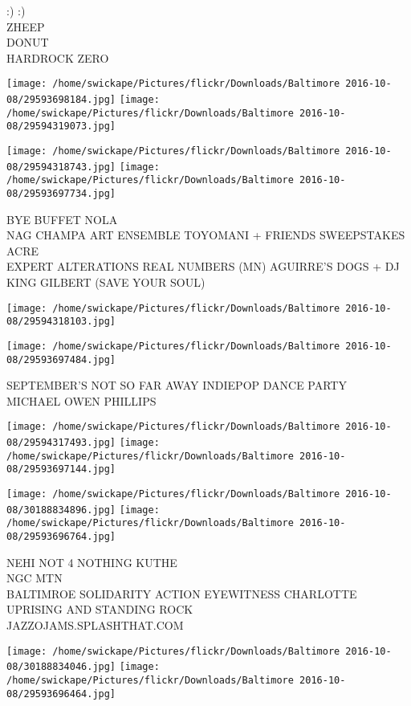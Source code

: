 \documentclass[10pt,letterpaper]{article}
\begin{document}
:) :)\\
ZHEEP\\
DONUT\\
HARDROCK ZERO
\pagebreak

\texttt{[image: /home/swickape/Pictures/flickr/Downloads/Baltimore 2016-10-08/29593698184.jpg]}
\texttt{[image: /home/swickape/Pictures/flickr/Downloads/Baltimore 2016-10-08/29594319073.jpg]}

\texttt{[image: /home/swickape/Pictures/flickr/Downloads/Baltimore 2016-10-08/29594318743.jpg]}
\texttt{[image: /home/swickape/Pictures/flickr/Downloads/Baltimore 2016-10-08/29593697734.jpg]}

BYE BUFFET NOLA\\
NAG CHAMPA ART ENSEMBLE TOYOMANI + FRIENDS SWEEPSTAKES\\
ACRE\\
EXPERT ALTERATIONS REAL NUMBERS (MN) AGUIRRE'S DOGS + DJ KING GILBERT (SAVE YOUR SOUL)
\pagebreak

\texttt{[image: /home/swickape/Pictures/flickr/Downloads/Baltimore 2016-10-08/29594318103.jpg]}

\vspace{0.25in}
\texttt{[image: /home/swickape/Pictures/flickr/Downloads/Baltimore 2016-10-08/29593697484.jpg]}

SEPTEMBER'S NOT SO FAR AWAY INDIEPOP DANCE PARTY\\
MICHAEL OWEN PHILLIPS
\pagebreak

\texttt{[image: /home/swickape/Pictures/flickr/Downloads/Baltimore 2016-10-08/29594317493.jpg]}
\texttt{[image: /home/swickape/Pictures/flickr/Downloads/Baltimore 2016-10-08/29593697144.jpg]}

\texttt{[image: /home/swickape/Pictures/flickr/Downloads/Baltimore 2016-10-08/30188834896.jpg]}
\texttt{[image: /home/swickape/Pictures/flickr/Downloads/Baltimore 2016-10-08/29593696764.jpg]}

NEHI NOT 4 NOTHING KUTHE\\
NGC MTN\\
BALTIMROE SOLIDARITY ACTION EYEWITNESS CHARLOTTE UPRISING AND STANDING ROCK\\
JAZZOJAMS.SPLASHTHAT.COM
\pagebreak

\texttt{[image: /home/swickape/Pictures/flickr/Downloads/Baltimore 2016-10-08/30188834046.jpg]}
\texttt{[image: /home/swickape/Pictures/flickr/Downloads/Baltimore 2016-10-08/29593696464.jpg]}
\end{document}
